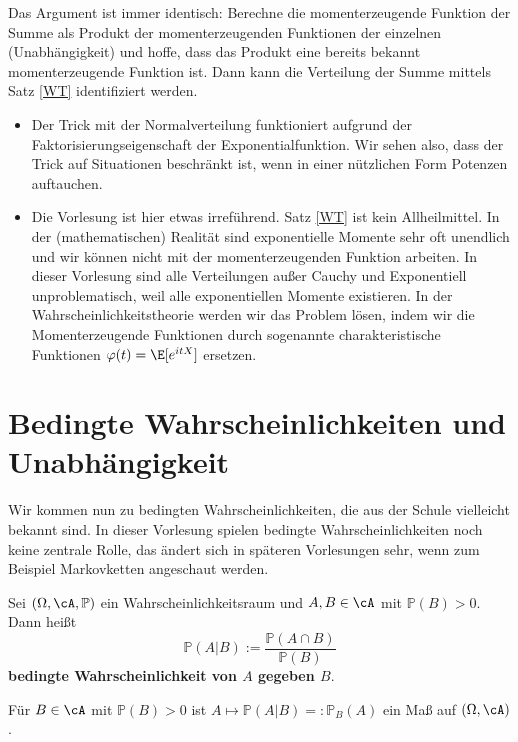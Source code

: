 Das Argument ist immer identisch: Berechne die momenterzeugende Funktion der Summe als Produkt der momenterzeugenden Funktionen der einzelnen (Unabh\"angigkeit) und hoffe, dass das Produkt eine bereits bekannt momenterzeugende Funktion ist. Dann kann die Verteilung der Summe mittels Satz \ref{WT} identifiziert werden. 
\begin{bem}
\abs
\begin{itemize}
\item Der Trick mit der Normalverteilung funktioniert aufgrund der Faktorisierungseigenschaft der Exponentialfunktion. Wir sehen also, dass der Trick auf Situationen beschr\"ankt ist, wenn in einer n\"utzlichen Form Potenzen auftauchen. 
\item Die Vorlesung ist hier etwas irref\"uhrend. Satz \ref{WT} ist kein Allheilmittel. In der (mathematischen) Realit\"at sind exponentielle Momente sehr oft unendlich und wir k\"onnen nicht mit der momenterzeugenden Funktion arbeiten. In dieser Vorlesung sind alle Verteilungen au\ss er Cauchy und Exponentiell unproblematisch, weil alle exponentiellen Momente existieren. In der Wahrscheinlichkeitstheorie werden wir das Problem l\"osen, indem wir die Momenterzeugende Funktionen durch sogenannte charakteristische Funktionen $\varphi(t)=\E[e^{itX}]$ ersetzen. 
\end{itemize}
\end{bem}


\section{Bedingte Wahrscheinlichkeiten und Unabhängigkeit}\label{Sunab}
Wir kommen nun zu bedingten Wahrscheinlichkeiten, die aus der Schule vielleicht bekannt sind. In dieser Vorlesung spielen bedingte Wahrscheinlichkeiten noch keine zentrale Rolle, das \"andert sich in sp\"ateren Vorlesungen sehr, wenn zum Beispiel Markovketten angeschaut werden.
\begin{deff}
	Sei $(\Omega, \cA, \mathbb P)$ ein Wahrscheinlichkeitsraum und $A, B \in \cA$ mit $ \mathbb P(B)> 0$. Dann heißt \[ \mathbb{P}(A|B) := \frac{\mathbb{P}(A \cap B)}{\mathbb{P}(B)}\]
	\textbf{bedingte Wahrscheinlichkeit von $A$ gegeben $B$}.	
\end{deff}

\begin{lemma}
	Für $ B \in \cA$ mit $ \mathbb{P}(B)> 0$ ist $ A \mapsto \mathbb{P}(A|B) =: \mathbb{P}_B(A)$ ein Maß auf $(\Omega, \cA)$.
\end{lemma}

